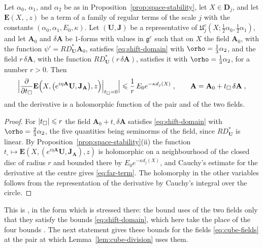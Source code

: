 \documentclass[11pt]{preprint}
\makeatletter
\let\rho\orho
\DeclarePairedDelimiter{\abs}{\lvert}{\rvert}
\newcommand*{\bigcdot}{}%
\DeclareRobustCommand*{\bigcdot}{%
	\mathbin{\mathpalette\bigcdot@{}}%
}
\newcommand*{\bigcdot@scalefactor}{.7}
\newcommand*{\bigcdot@widthfactor}{1.15}
\newcommand*{\bigcdot@}[2]{%
	\sbox0{$#1\vcenter{}$}%
	\sbox2{$#1\cdot\m@th$}%
	\hbox to \bigcdot@widthfactor\wd2{%
		\hss
		\raise\ht0\hbox{%
			\scalebox{\bigcdot@scalefactor}{%
				\lower\ht0\hbox{$#1\bullet\m@th$}%
			}%
		}%
		\hss
	}%
}
\numberwithin{equation}{section}
\makeatother
\begin{document}
\begin{proposition}\label{prop:far-terms}
Let $\alpha_0$, $\alpha_1$, and $\alpha_2$ be as in Proposition~\ref{prop:space-stability}, let $X \in \mathbf D_j$, and let $\mathbf E(X, \bigcdot\,, z)$ be a term of a family of regular terms of the scale $j$ with the constants $(\alpha_0, \alpha_1, E_0, \kappa)$. Let $(\mathbf U, \mathbf J)$ be a representative of $\mathfrak U^c_j(X; \frac{1}{2}\alpha_0, \frac{1}{2}\alpha_1)$, and let $\mathbf A_0$ and $\delta\mathbf A$ be $1$-forms with values in $\mathfrak g^c$ such that on $X$ the field $\mathbf A_0$, with the function $\psi' = RD^*_{\mathbf U}\mathbf A_0$, satisfies \eqref{eq:shift-domain} with $\rho = \frac{1}{3}\alpha_2$, and the field $r\,\delta\mathbf A$, with the function $RD^*_{\mathbf U}(r\,\delta\mathbf A)$, satisfies it with $\rho = \frac{1}{3}\alpha_2$, for a number $r > 0$. Then
\begin{equation}\label{eq:far-term}
    \Bigl\lvert\frac{\partial}{\partial t_\square}\mathbf E\Bigl(X, \bigl(e^{i\eta\mathbf A}\mathbf U, \mathbf J_{\mathbf A}\bigr), z\Bigr)\Big|_{t_\square = 0}\Bigr\rvert \leqslant \frac{1}{r}\,E_0e^{-\kappa d_j(X)}\;,
    \qquad
    \mathbf A = \mathbf A_0 + t_\square\,\delta\mathbf A\;,
\end{equation}
and the derivative is a holomorphic function of the pair and of the two fields.
\end{proposition}

\begin{proof}
For $\abs{t_\square} \leqslant r$ the field $\mathbf A_0 + t_\square\,\delta\mathbf A$ satisfies \eqref{eq:shift-domain} with $\rho = \frac{2}{3}\alpha_2$, the five quantities being seminorms of the field, since $RD^*_{\mathbf U}$ is linear. By Proposition~\ref{prop:space-stability}(ii) the function $t_\square \mapsto \mathbf E(X, (e^{i\eta\mathbf A}\mathbf U, \mathbf J_{\mathbf A}), z)$ is holomorphic on a neighbourhood of the closed disc of radius $r$ and bounded there by $E_0e^{-\kappa d_j(X)}$, and Cauchy's estimate for the derivative at the centre gives \eqref{eq:far-term}. The holomorphy in the other variables follows from the representation of the derivative by Cauchy's integral over the circle.
\end{proof}

This is \cite[(3.15)--(3.17)]{BalabanRG1}, in the form which is stressed there: the bound uses of the two fields only that they satisfy the bounds \eqref{eq:shift-domain}, which here take the place of the four bounds \cite[(3.14)]{BalabanRG1}. The next statement gives these bounds for the fields \eqref{eq:cube-fields} at the pair at which Lemma~\ref{lem:cube-division} uses them.
\end{document}

